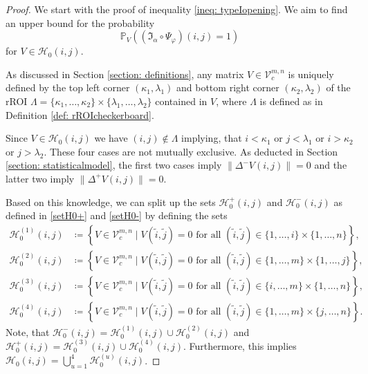 \documentclass[a4paper,12pt]{article}
\newcommand{\norm}[1]{\lVert#1\rVert}
\theoremstyle{plain}
\theoremstyle{definition}
\begin{document}
\begin{proof}
	We start with the proof of inequality \eqref{ineq: typeIopening}. We aim to find an upper bound for the probability
	\begin{equation*}
		\mathbb{P}_V\left( (\mathfrak{I}_\alpha \circ \Psi_\varphi)(i, j) = 1 \right)
	\end{equation*}
	for $V \in \mathcal{H}_0(i, j)$.
	
	As discussed in Section \ref{section: definitions}, any matrix $V \in \mathcal{V}_c^{m, n}$ is uniquely defined by the top left corner $(\kappa_1, \lambda_1)$ and bottom right corner $(\kappa_2, \lambda_2)$ of the rROI $\varLambda = \{ \kappa_1, \dots, \kappa_2 \} \times \{ \lambda_1, \dots, \lambda_2 \}$ contained in $V$, where $\varLambda$ is defined as in Definition \ref{def: rROIcheckerboard}.
	
	Since $V \in \mathcal{H}_0(i, j)$ we have $(i, j) \notin \varLambda$ implying, that $i < \kappa_1$ or $j < \lambda_1$ or $i > \kappa_2$ or $j > \lambda_2$. These four cases are not mutually exclusive. As deducted in Section \ref{section: statisticalmodel}, the first two cases imply $\norm{\Delta^- V(i, j)} = 0$ and the latter two imply $\norm{\Delta^+ V(i, j)} = 0$.
	
	Based on this knowledge, we can split up the sets $\mathcal{H}_0^+(i, j)$ and $\mathcal{H}_0^-(i, j)$ as defined in \eqref{setH0+} and \eqref{setH0-} by defining the sets
	\begin{align*}
		\mathcal{H}_0^{(1)}(i, j) &\coloneqq \left\{ V \in \mathcal{V}_c^{m, n} \mid V(\tilde{i}, \tilde{j}) = 0 \textrm{ for all } (\tilde{i}, \tilde{j}) \in \{ 1, \dots, i \} \times \{ 1, \dots, n \} \right\}, \\
		\mathcal{H}_0^{(2)}(i, j) &\coloneqq \left\{ V \in \mathcal{V}_c^{m, n} \mid V(\tilde{i}, \tilde{j}) = 0 \textrm{ for all } (\tilde{i}, \tilde{j}) \in \{ 1, \dots, m \} \times \{ 1, \dots, j \} \right\}, \\
		\mathcal{H}_0^{(3)}(i, j) &\coloneqq \left\{ V \in \mathcal{V}_c^{m, n} \mid V(\tilde{i}, \tilde{j}) = 0 \textrm{ for all } (\tilde{i}, \tilde{j}) \in \{ i, \dots, m \} \times \{ 1, \dots, n \} \right\}, \\
		\mathcal{H}_0^{(4)}(i, j) &\coloneqq \left\{ V \in \mathcal{V}_c^{m, n} \mid V(\tilde{i}, \tilde{j}) = 0 \textrm{ for all } (\tilde{i}, \tilde{j}) \in \{ 1, \dots, m \} \times \{ j, \dots, n \} \right\}.
	\end{align*}
	Note, that $\mathcal{H}_0^-(i, j) = \mathcal{H}_0^{(1)}(i, j) \cup \mathcal{H}_0^{(2)}(i, j)$ and $\mathcal{H}_0^+(i, j) = \mathcal{H}_0^{(3)}(i, j) \cup \mathcal{H}_0^{(4)}(i, j)$. Furthermore, this implies $\mathcal{H}_0(i, j) = \bigcup_{u = 1}^4 \mathcal{H}_0^{(u)}(i, j)$.
	

\end{proof}
\end{document}
